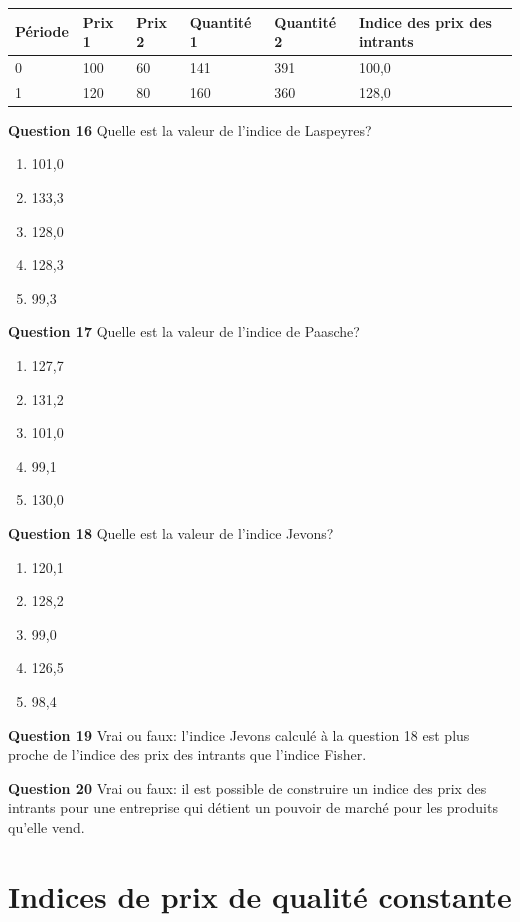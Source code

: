 \documentclass[]{article}
\begin{document}
\begin{longtable}[]{@{}llllll@{}}
\toprule
Période & Prix 1 & Prix 2 & Quantité 1 & Quantité 2 & Indice des prix des intrants\tabularnewline
\midrule
\endhead
0 & 100 & 60 & 141 & 391 & 100,0\tabularnewline
1 & 120 & 80 & 160 & 360 & 128,0\tabularnewline
\bottomrule
\end{longtable}

\textbf{Question 16} Quelle est la valeur de l'indice de Laspeyres?

\begin{enumerate}
\def\labelenumi{\alph{enumi})}
\item
  101,0
\item
  133,3
\item
  128,0
\item
  128,3
\item
  99,3
\end{enumerate}

\textbf{Question 17} Quelle est la valeur de l'indice de Paasche?

\begin{enumerate}
\def\labelenumi{\alph{enumi})}
\item
  127,7
\item
  131,2
\item
  101,0
\item
  99,1
\item
  130,0
\end{enumerate}

\textbf{Question 18} Quelle est la valeur de l'indice Jevons?

\begin{enumerate}
\def\labelenumi{\alph{enumi})}
\item
  120,1
\item
  128,2
\item
  99,0
\item
  126,5
\item
  98,4
\end{enumerate}

\textbf{Question 19} Vrai ou faux: l'indice Jevons calculé à la question 18 est plus proche de l'indice des prix des intrants que l'indice Fisher.

\textbf{Question 20} Vrai ou faux: il est possible de construire un indice des prix des intrants pour une entreprise qui détient un pouvoir de marché pour les produits qu'elle vend.

\hypertarget{part-indices-de-prix-de-qualituxe9-constante}{%
\part{Indices de prix de qualité constante}\label{part-indices-de-prix-de-qualituxe9-constante}}
\end{document}
